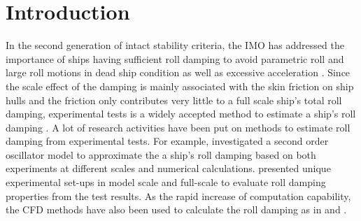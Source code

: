 \section{Introduction}
\label{se:introduction}

In the second generation of intact stability criteria, the IMO has addressed the importance of ships having sufficient roll damping to avoid parametric roll and large roll motions in dead ship condition as well as excessive acceleration \parencite{imo_finalization_2016}. 
Since the scale effect of the damping is mainly associated with the skin friction on ship hulls and the friction only contributes very little to a full scale ship's total roll damping, experimental tests is a widely accepted method to estimate a ship's roll damping \parencite{imo_1200_2006}. A lot of research activities have been put on methods to estimate roll damping from experimental tests. For example, \parencite[]{hua_approximation_2011} investigated a second order oscillator model to approximate the a ship's roll damping based on both experiments at different scales and numerical calculations. \parencite{soder_ikeda_2019} presented unique experimental set-ups in model scale and full-scale to evaluate roll damping properties from the test results. 
As the rapid increase of computation capability, the CFD methods have also been used to calculate the roll damping as in \parencite{kristiansen_experimental_2014} and \parencite{henry_peter_piehl_ship_2016}.  

